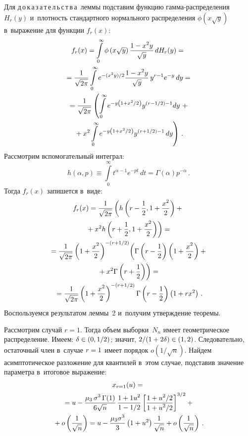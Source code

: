 \begin{multicols}{2}
Для д\,о\,к\,а\,з\,а\,т\,е\,л\,ь\,с\,т\,в\,а\ леммы подставим функцию 
гам\-ма-рас\-пре\-\-\-деления $H_r (y)$ и~плотность стандартного 
нормального распределения  $\phi\left(x\sqrt{y}\right)$ 
в~выражение для функции $f_r(x)$:
\begin{multline*}
f_r(x)=\int\limits_{0}^{\infty} \phi\left(x\sqrt{y}\right) 
\fr{1-x^{2}y}{\sqrt{y}}\, dH_r(y) ={}\\
     {}=\fr{1}{\sqrt{2\pi}}\int\limits_{0}^{\infty} e^{-({x^{2}y})/{2}} 
     \fr{1-x^{2}y}{\sqrt{y}}\, y^{r-1} e^{-y}\, dy = {}\\
     {}=\fr{1}{\sqrt{2\pi}}\left(\int\limits_{0}^{\infty} e^{-y\left(1+
     {x^{2}}/{2}\right)} y^{\left(r-1/2\right)-1}dy \right. +{}\\
     \left. {}+ x^{2}\int\limits_{0}^{\infty} e^{-y\left(1+{x^{2}}/{2}\right)} 
     y^{\left(r+1/2\right)-1}\, dy \right)\,.
\end{multline*}
Рассмотрим вспомогательный интеграл:
\begin{equation*}
h(\alpha, p) \equiv\int\limits_{0}^{\infty}t^{\alpha-1}e^{-pt}\,dt=
      \Gamma(\alpha)p^{-\alpha}\,.
\end{equation*}
Тогда $f_r(x)$ запишется в~виде:
\begin{multline*}
f_r(x)  =\fr{1}{\sqrt{2\pi}}  \left(h\left(r-\fr{1}{2}, 1+
\fr{x^{2}}{2}\right)+{}\right.\\
\left.{} +x^{2}h\left(r+\fr{1}{2}, 1+\fr{x^{2}}{2}\right)\right) =     {}\\
{}=\fr{1}{\sqrt{2\pi}} \left(1+\fr{x^{2}}{2}\right)^{-\left(r+{1}/{2}\right)}
  \!\left(\Gamma\left(r-\fr{1}{2}\right)\left(1+\fr{x^{2}}{2}\right)+{}\right.\\
  \left.{}+x^{2}\Gamma\left(
  r+\fr{1}{2}\right)\right) = {}\\
{}=\fr{1}{\sqrt{2\pi}}\left(1+\fr{x^{2}}{2}\right)^{-\left(r+{1}/{2}\right)}\Gamma
\left(r-\fr{1}{2}\right)\left(1+rx^{2}\right)\,.
\end{multline*}
Воспользуемся результатом леммы~2 и~получим
 утверждение теоремы.


Рассмотрим случай $r=1$. Тогда объем выборки~$N_n$ имеет
геометрическое распределение. Имеем:  $\delta \hm\in \left(0,1/2
\right)$; значит,   $2/(1\hm+2\delta) \hm\in \left(1,2\right)$.
Следовательно, остаточный член в~случае $r\hm=1$ имеет порядок
$o\left(1/\sqrt{n}\right)$. Найдем асимптотическое разложение для
квантилей в~этом случае, подставив значение параметра в~итоговое
выражение:
\begin{multline*}
x_{r=1}(u)={}\\
{}=u-\fr{\mu_3\, \sigma^{3}\, \Gamma(1)}{6\sqrt{n}}\,
\fr{1+1 u^{2}}{1-1/2}   \left[{\fr{1+u^{2}/2}{1+u^{2}/2}}\right]^{3/2}+{}\\
{}+o\left(\fr{1}{\sqrt{n}}\right) =
u-\fr{\mu_3 \sigma^{3}}{3}\left( 1+u^{2}\right)\fr{1}{\sqrt{n}}+
o\left(\fr{1}{\sqrt{n}}\right)\,.
\end{multline*}



\end{multicols}
